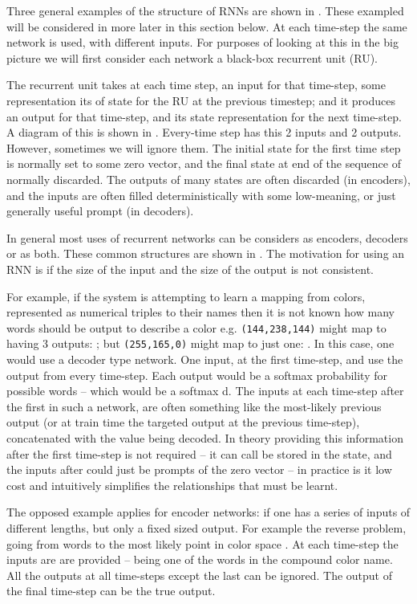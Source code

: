 \documentclass[12pt,parskip]{komatufte}
\begin{document}
Three general examples of the structure of RNNs are shown in .
These exampled will be considered in more later in this section below.
At each time-step the same network is used, with different inputs.
For purposes of looking at this in the big picture we will first consider each network a black-box recurrent unit (RU).

The recurrent unit takes at each time step, an input for that time-step, some representation its of state for the RU at the previous timestep; and it produces an output for that time-step, and its state representation for the next time-step.
A diagram of this is shown in .
Every-time step has this 2 inputs and 2 outputs.
However, sometimes we will ignore them.
The initial state for the first time step is normally set to some zero vector,
and the final state at end of the sequence of normally discarded.
The outputs of many states are often discarded (in encoders), and the inputs are often filled deterministically with some low-meaning, or just generally useful prompt (in decoders).

In general most uses of recurrent networks can be considers as encoders, decoders or as both.
These common structures are shown in .
The motivation for using an RNN is if the size of the input and the size of the output is not consistent.

For example, if the system is attempting to learn a mapping from colors, represented as numerical triples to their names then it is not known how many words should be output to describe a color e.g. \texttt{(144,238,144)} might map to having 3 outputs: ; but \texttt{(255,165,0)} might map to just one:  .
In this case, one would use a decoder type network.
One input, at the first time-step, and use the output from every time-step.
Each output would be a softmax probability for possible words -- which would be a softmax d.
The inputs at each time-step after the first in such a network, are often something like the most-likely previous output (or at train time the targeted output at the previous time-step), concatenated with the value being decoded.
In theory providing this information after the first time-step is not required -- it can call be stored in the state, and the inputs after could just be prompts of the zero vector -- in practice is it low cost and intuitively simplifies the relationships that must be learnt.

The opposed example applies for encoder networks:
if one has a series of inputs of different lengths,
but only a fixed sized output.
For example the reverse problem, going from words to the most likely point in color space .
At each time-step the inputs are are provided -- being one of the words in the compound color name.
All the outputs at all time-steps except the last can be ignored.
The output of the final time-step can be the true output.
\end{document}
